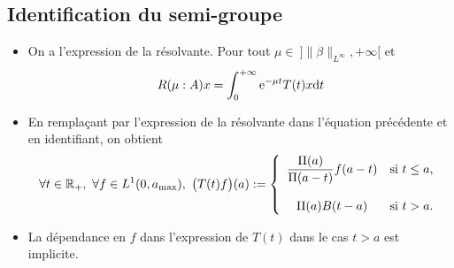 \subsection{Identification du semi-groupe}
\begin{frame}
    \begin{itemize}
        \item On a l'expression de la résolvante. Pour tout $\mu \in \ ]\|\beta\|_{L^\infty}, +\infty[$ et 
        \begin{equation*}
            R(\mu : A)x = \int_0^{+\infty}\mathrm{e}^{-\mu t}T(t)x\mathrm{d} t
        \end{equation*} \pause
        \item En remplaçant par l'expression de la résolvante dans l'équation précédente et en identifiant, on obtient
        \begin{equation*}
            \forall t \in \mathbb{R}_+, \ \forall f \in L^1(0,a_{\max}), \ \big(T(t)f\big)(a) := \left\{\begin{array}{cl}\dfrac{\Pi(a)}{\Pi(a-t)}f(a-t) & \text{si } t \leq a, \\
            & \\
            \Pi(a)B(t-a) & \text{si } t > a.
            \end{array}\right.
        \end{equation*} \pause 
        \item La dépendance en $f$ dans l'expression de $T(t)$ dans le cas $t>a$ est implicite.
    \end{itemize}
\end{frame}

